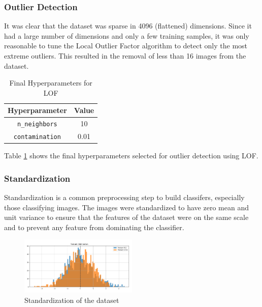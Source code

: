 \documentclass[conference]{IEEEtran}
\begin{document}
    \subsubsection{Outlier Detection}
    \label{sec:outlierdetection}
    It was clear that the dataset was sparse in 4096 (flattened) dimensions.
    Since it had a large number of dimensions and only a few training samples, it was only reasonable to tune the
    Local Outlier Factor algorithm to detect only the most extreme outliers.
    This resulted in the removal of less than 16 images from the dataset.

    \begin{table}[htbp]
        \caption{Final Hyperparameters for LOF}
        \begin{center}
            \begin{tabular}{|c|c|}
                \hline
                \textbf{Hyperparameter} & \textbf{Value} \\
                \hline
                \texttt{n\_neighbors} & 10 \\
                \hline
                \texttt{contamination} & 0.01 \\
                \hline
            \end{tabular}
            \label{tab:lof}
        \end{center}
    \end{table}

    Table \ref{tab:lof} shows the final hyperparameters selected for outlier detection using LOF.

    \subsubsection{Standardization}
    \label{sec:standardization}
    Standardization is a common preprocessing step to build classifers, especially those classifying images.
    The images were standardized to have zero mean and unit variance to ensure that the features of the
    dataset were on the same scale and to prevent any feature from dominating the classifier.

    \begin{figure}[htbp]
        \centerline{\includegraphics[width=0.5\textwidth]{Assets/standardized.png}}
        \caption{Standardization of the dataset}
        \label{fig:standardization}
    \end{figure}
\end{document}
